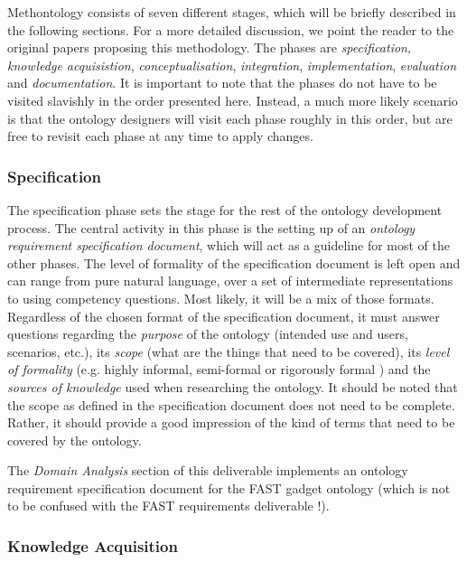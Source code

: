 \documentclass[twoside]{fast_latex}
\begin{document}
Methontology consists of seven different stages, which will be briefly described in the following sections. For a more detailed discussion, we point the reader to the original papers proposing this methodology. The phases are \emph{specification}, \emph{knowledge acquisistion}, \emph{conceptualisation}, \emph{integration}, \emph{implementation}, \emph{evaluation} and \emph{documentation}. It is important to note that the phases do not have to be visited slavishly in the order presented here. Instead, a much more likely scenario is that the ontology designers will visit each phase roughly in this order, but are free to revisit each phase at any time to apply changes.

\subsubsection{Specification} %
\label{ssub:specification}

The specification phase sets the stage for the rest of the ontology development process. The central activity in this phase is the setting up of an \emph{ontology requirement specification document}, which will act as a guideline for most of the other phases. The level of formality of the specification document is left open and can range from pure natural language, over a set of intermediate representations to using competency questions. Most likely, it will be a mix of those formats. Regardless of the chosen format of the specification document, it must answer questions regarding the \emph{purpose} of the ontology (intended use and users, scenarios, etc.), its \emph{scope} (what are the things that need to be covered), its \emph{level of formality} (e.g. highly informal, semi-formal or rigorously formal \cite{uschold1996ontologies}) and the \emph{sources of knowledge} used when researching the ontology. It should be noted that the scope as defined in the specification document does not need to be complete. Rather, it should provide a good impression of the kind of terms that need to be covered by the ontology.

The \emph{Domain Analysis} section of this deliverable implements an ontology requirement specification document for the FAST gadget ontology (which is not to be confused with the FAST requirements deliverable \cite{villoslada2010fast_requirements}!).

\subsubsection{Knowledge Acquisition} %
\label{ssub:knowledge_acquisition}
\end{document}
